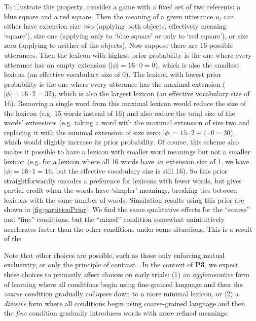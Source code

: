 \documentclass[10pt, jou, floatsintext]{apa7}
\begin{document}
To illustrate this property, consider a game with a fixed set of two referents: a blue square and a red square. 
Then the meaning of a given utterance $u_i$ can either have extension size two (applying both objects, effectively meaning ‘square’), size one (applying only to ‘blue square’ or only to ‘red square’), or size zero (applying to neither of the objects). 
Now suppose there are 16 possible utterances. 
Then the lexicon with highest prior probability is the one where every utterance has an empty extension ($|\phi| = 16 \cdot 0 = 0$), which is also the smallest lexicon (an effective vocabulary size of 0). 
The lexicon with lowest prior probability is the one where every utterance has the maximal extension ($|\phi| = 16 \cdot 2 = 32$), which is also the largest lexicon (an effective vocabulary size of 16). 
Removing a single word from this maximal lexicon would reduce the size of the lexicon (e.g. 15 words instead of 16) and also reduce the total size of the words' extensions (e.g. taking a word with the maximal extension of size two and replacing it with the minimal extension of size zero: $|\phi| = 15 \cdot 2 + 1 \cdot 0 = 30$), which would slightly increase its prior probability. 
Of course, this scheme also makes it possible to have a lexicon with smaller word meanings but not a smaller lexicon (e.g. for a lexicon where all 16 words have an extension size of 1, we have $|\phi| = 16 \cdot 1 = 16$, but the effective vocabulary size is still 16). 
So this prior straightforwardly encodes a preference for lexicons with fewer words, but gives partial credit when the words have ‘simpler’ meanings, breaking ties between lexicons with the same number of words.
Simulation results using this prior are shown in \ref{fig:partitionPrior}. 
We find the same qualitative effects for the ``coarse'' and ``fine'' conditions, but the ``mixed'' condition somewhat unintuitively accelerates faster than the other conditions under some situations.
This is a result of the 

Note that other choices are possible, such as those only enforcing mutual exclusivity, or only the principle of contrast \cite{clark1987principle}.
In the context of \textbf{P3}, we expect these choices to primarily affect choices on early trials: (1) an \emph{agglomerative} form of learning where all conditions begin using fine-grained language and then the \emph{coarse} condition gradually collapses down to a more minimal lexicon, or (2) a \emph{divisive} form where all conditions begin using coarse-grained language and then the \emph{fine} condition gradually introduces words with more refined meanings. 
\end{document}
